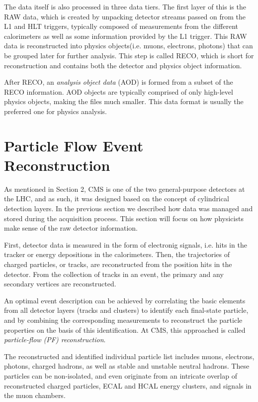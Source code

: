  The data itself is also processed in three data tiers. The first layer of this is the RAW data, which is created by unpacking detector streams passed on from the L1 and HLT triggers, typically composed of measurements from the different calorimeters as well as some information provided by the L1 trigger. This RAW data is reconstructed into physics objects(i.e. muons, electrons, photons) that can be grouped later for further analysis. This step is called RECO, which is short for reconstruction and contains both the detector and physics object information. 

 After RECO, an \textit{analysis object data} (AOD) is formed from a subset of the RECO information. AOD objects are typically comprised of only high-level physics objects, making the files much smaller. This data format is usually the preferred one for physics analysis.



\section{Particle Flow Event Reconstruction}
\label{sec:track}

As mentioned in Section 2, CMS is one of the two general-purpose detectors at the LHC, and as such, it was designed based on the concept of cylindrical detection layers. In the previous section we described how data was managed and stored during the acquisition process. This section will focus on how physicists make sense of the raw detector information.  

 First, detector data is measured in the form of electronig signals, i.e. hits in the tracker or energy depositions in the calorimeters. Then, the trajectories of charged particles, or tracks, are reconstructed from the position hits in the detector. From the collection of tracks in an event, the primary and any secondary vertices are reconstructed. 

An optimal event description can be achieved by correlating the basic elements from all detector layers (tracks and clusters) to identify each final-state particle, and by combining the corresponding measurements to reconstruct the particle properties on the basis of this identification. At CMS, this approached is called \textit{particle-flow (PF) reconstruction}.

The reconstructed and identified individual particle list includes muons, electrons, photons, charged hadrons, as well as stable and unstable neutral hadrons. These particles can be non-isolated, and even originate from an intricate overlap of reconstructed charged particles, ECAL and HCAL energy clusters, and signals in the muon chambers.

